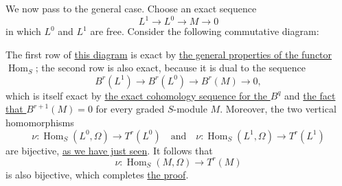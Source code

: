 \label{fac:III:4:no:71:proof:general-case}
We now pass to the general case. Choose an exact sequence
\label{fac:III:4:no:71:formula:free-presentation}
\[
L^1\longrightarrow L^0\longrightarrow M\longrightarrow0
\]
in which $L^0$ and $L^1$ are free. Consider the following commutative
diagram:
\label{fac:III:4:no:71:diagram:nu}
\begin{center}
\end{center}

The first row of \hyperref[fac:III:4:no:71:diagram:nu]{this diagram} is exact
by \hyperref[fac:III:4:no:68:properties]{the general properties of the
functor $\operatorname{Hom}_S$}; the second row is also exact,
because it is dual to the sequence
\label{fac:III:4:no:71:formula:B-exact}
\[
B^r(L^1)\longrightarrow B^r(L^0)\longrightarrow B^r(M)
\longrightarrow0,
\]
which is itself exact by
\hyperref[fac:III:4:no:70:formula:long-exact-B]{the exact cohomology
sequence for the $B^q$} and
\hyperref[fac:III:4:no:70:property:B-vanishing]{the fact that
$B^{r+1}(M)=0$} for every graded $S$-module $M$.
Moreover, the two vertical homomorphisms
\label{fac:III:4:no:71:formula:free-nu}
\[
\nu:\operatorname{Hom}_S(L^0,\Omega)\longrightarrow T^r(L^0)
\quad\text{and}\quad
\nu:\operatorname{Hom}_S(L^1,\Omega)\longrightarrow T^r(L^1)
\]
are bijective,
\hyperref[fac:III:4:no:71:proof:free-case]{as we have just seen}. It follows
that
\label{fac:III:4:no:71:formula:general-nu}
\[
\nu:\operatorname{Hom}_S(M,\Omega)\longrightarrow T^r(M)
\]
is also bijective, which completes
\hyperref[fac:III:4:no:71:prop:2]{the proof}.
